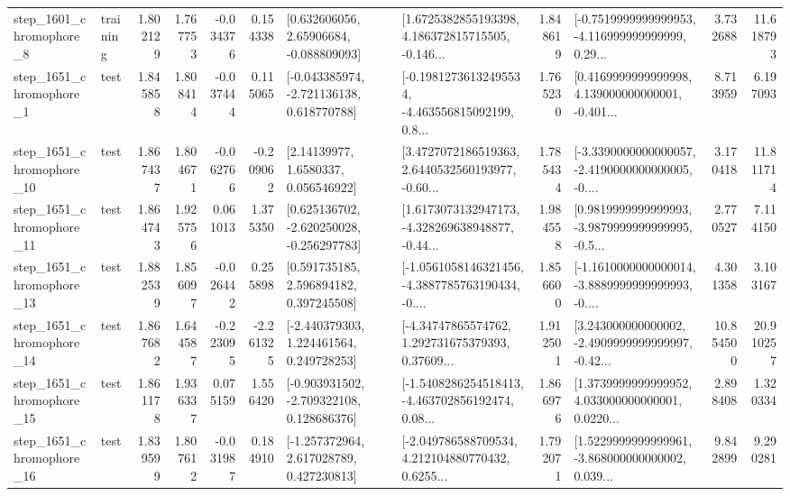 \begin{tabular}{llrrrrllrlrr}
  step\_1601\_chromophore\_8 &  training &      1.802129 &    1.767753 &     -0.034376 &  0.154338 &     [0.632606056, 2.65906684, -0.088809093] &  [1.6725382855193398, 4.186372815715505, -0.146... &       1.848619 &  [-0.7519999999999953, -4.116999999999999, 0.29... &            3.732688 &         11.618793 \\
  step\_1651\_chromophore\_1 &      test &      1.845858 &    1.808414 &     -0.037444 &  0.115065 &   [-0.043385974, -2.721136138, 0.618770788] &  [-0.19812736132495534, -4.463556815092199, 0.8... &       1.765230 &  [0.4169999999999998, 4.139000000000001, -0.401... &            8.713959 &          6.197093 \\
 step\_1651\_chromophore\_10 &      test &      1.867437 &    1.804671 &     -0.062766 & -0.209062 &        [2.14139977, 1.6580337, 0.056546922] &  [3.4727072186519363, 2.6440532560193977, -0.60... &       1.785434 &  [-3.3390000000000057, -2.4190000000000005, -0.... &            3.170418 &         11.811714 \\
 step\_1651\_chromophore\_11 &      test &      1.864743 &    1.925756 &      0.061013 &  1.375350 &   [0.625136702, -2.620250028, -0.256297783] &  [1.6173073132947173, -4.328269638948877, -0.44... &       1.984558 &  [0.9819999999999993, -3.9879999999999995, -0.5... &            2.770527 &          7.114150 \\
 step\_1651\_chromophore\_13 &      test &      1.882539 &    1.856097 &     -0.026442 &  0.255898 &     [0.591735185, 2.596894182, 0.397245508] &  [-1.0561058146321456, -4.3887785763190434, -0.... &       1.856600 &  [-1.1610000000000014, -3.8889999999999993, -0.... &            4.301358 &          3.103167 \\
 step\_1651\_chromophore\_14 &      test &      1.867682 &    1.644587 &     -0.223095 & -2.261325 &    [-2.440379303, 1.224461564, 0.249728253] &  [-4.34747865574762, 1.292731675379393, 0.37609... &       1.912501 &  [3.243000000000002, -2.4909999999999997, -0.42... &           10.854500 &         20.910257 \\
 step\_1651\_chromophore\_15 &      test &      1.861178 &    1.936337 &      0.075159 &  1.556420 &   [-0.903931502, -2.709322108, 0.128686376] &  [-1.5408286254518413, -4.463702856192474, 0.08... &       1.866976 &  [1.3739999999999952, 4.033000000000001, 0.0220... &            2.898408 &          1.320334 \\
 step\_1651\_chromophore\_16 &      test &      1.839599 &    1.807612 &     -0.031987 &  0.184910 &    [-1.257372964, 2.617028789, 0.427230813] &  [-2.049786588709534, 4.212104880770432, 0.6255... &       1.792071 &  [1.5229999999999961, -3.868000000000002, 0.039... &            9.842899 &          9.290281 \\

\end{tabular}
